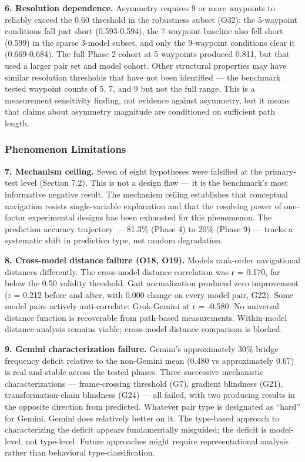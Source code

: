 \textbf{6. Resolution dependence.} Asymmetry requires 9 or more waypoints to reliably exceed the 0.60 threshold in the robustness subset (O32): the 5-waypoint conditions fall just short (0.593-0.594), the 7-waypoint baseline also fell short (0.599) in the sparse 3-model subset, and only the 9-waypoint conditions clear it (0.669-0.684). The full Phase 2 cohort at 5 waypoints produced 0.811, but that used a larger pair set and model cohort. Other structural properties may have similar resolution thresholds that have not been identified --- the benchmark tested waypoint counts of 5, 7, and 9 but not the full range. This is a measurement sensitivity finding, not evidence against asymmetry, but it means that claims about asymmetry magnitude are conditioned on sufficient path length.

\subsubsection{Phenomenon Limitations}\label{phenomenon-limitations}

\textbf{7. Mechanism ceiling.} Seven of eight hypotheses were falsified at the primary-test level (Section 7.2). This is not a design flaw --- it is the benchmark's most informative negative result. The mechanism ceiling establishes that conceptual navigation resists single-variable explanation and that the resolving power of one-factor experimental designs has been exhausted for this phenomenon. The prediction accuracy trajectory --- 81.3\% (Phase 4) to 20\% (Phase 9) --- tracks a systematic shift in prediction type, not random degradation.

\textbf{8. Cross-model distance failure (O18, O19).} Models rank-order navigational distances differently. The cross-model distance correlation was r = 0.170, far below the 0.50 validity threshold. Gait normalization produced zero improvement (r = 0.212 before and after, with 0.000 change on every model pair, G22). Some model pairs actively anti-correlate: Grok-Gemini at r = -0.580. No universal distance function is recoverable from path-based measurements. Within-model distance analysis remains viable; cross-model distance comparison is blocked.

\textbf{9. Gemini characterization failure.} Gemini's approximately 30\% bridge frequency deficit relative to the non-Gemini mean (0.480 vs approximately 0.67) is real and stable across the tested phases. Three successive mechanistic characterizations --- frame-crossing threshold (G7), gradient blindness (G21), transformation-chain blindness (G24) --- all failed, with two producing results in the opposite direction from predicted. Whatever pair type is designated as ``hard'' for Gemini, Gemini does relatively better on it. The type-based approach to characterizing the deficit appears fundamentally misguided; the deficit is model-level, not type-level. Future approaches might require representational analysis rather than behavioral type-classification.

